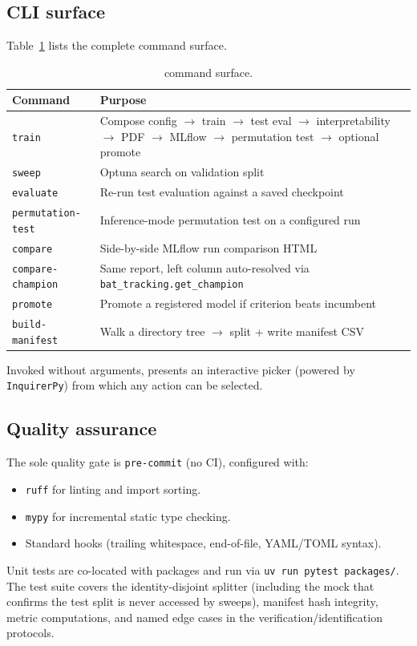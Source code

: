 \subsection{CLI surface}

Table~\ref{tab:cli} lists the complete \batcli command surface.

\begin{table}[h]
\centering
\caption{\batcli command surface.}
\label{tab:cli}
\setlength{\tabcolsep}{5pt}
\begin{tabular}{lp{8.5cm}}
\toprule
Command & Purpose \\
\midrule
\texttt{train}        & Compose config $\to$ train $\to$ test eval $\to$ interpretability $\to$ PDF $\to$ MLflow $\to$ permutation test $\to$ optional promote \\
\texttt{sweep}        & Optuna search on validation split \\
\texttt{evaluate}     & Re-run test evaluation against a saved checkpoint \\
\texttt{permutation-test} & Inference-mode permutation test on a configured run \\
\texttt{compare}      & Side-by-side MLflow run comparison HTML \\
\texttt{compare-champion} & Same report, left column auto-resolved via \texttt{bat\_tracking.get\_champion} \\
\texttt{promote}      & Promote a registered model if criterion beats incumbent \\
\texttt{build-manifest} & Walk a directory tree $\to$ split + write manifest CSV \\
\bottomrule
\end{tabular}
\end{table}

Invoked without arguments, \batcli presents an interactive picker (powered by
\texttt{InquirerPy}) from which any action can be selected.

\subsection{Quality assurance}

The sole quality gate is \texttt{pre-commit} (no CI), configured with:
\begin{itemize}[itemsep=1pt]
  \item \texttt{ruff} for linting and import sorting.
  \item \texttt{mypy} for incremental static type checking.
  \item Standard hooks (trailing whitespace, end-of-file, YAML/TOML syntax).
\end{itemize}
Unit tests are co-located with packages and run via \texttt{uv run pytest packages/}.
The test suite covers the identity-disjoint splitter (including the mock that confirms
the test split is never accessed by sweeps), manifest hash integrity, metric computations,
and named edge cases in the verification/identification protocols.
